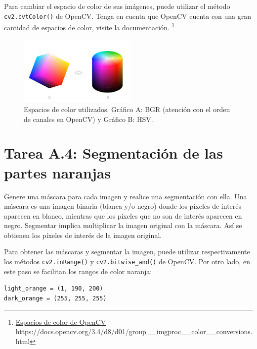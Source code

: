 Para cambiar el espacio de color de sus imágenes, puede utilizar el método \texttt{cv2.cvtColor()} de OpenCV. Tenga en cuenta que OpenCV cuenta con una gran cantidad de espacios de color, visite la documentación. \footnote{ \href{https://docs.opencv.org/3.4/d8/d01/group\_\_imgproc\_\_color\_\_conversions.html}{Espacios de color de OpenCV} https://docs.opencv.org/3.4/d8/d01/group\_\_imgproc\_\_color\_\_conversions.html}



\begin{figure}[h]
    \centering
    \includegraphics[width=0.5\textwidth]{Lab_2/template/figures/color_spaces.png}
    \caption{Espacios de color utilizados. Gráfico A: BGR (atención con el orden de canales en OpenCV) y Gráfico B: HSV.}
    
    \label{fig:color_spaces}
\end{figure}

\section*{Tarea A.4: Segmentación de las partes naranjas}

Genere una máscara para cada imagen y realice una segmentación con ella. Una máscara es una imagen binaria (blanca y/o negro) donde los píxeles de interés aparecen en blanco, mientras que los píxeles que no son de interés aparecen en negro. Segmentar implica multiplicar la imagen original con la máscara. Así se obtienen los píxeles de interés de la imagen original.

Para obtener las máscaras y segmentar la imagen, puede utilizar respectivamente los métodos \texttt{cv2.inRange()} y \texttt{cv2.bitwise\_and()} de OpenCV. Por otro lado, en este paso se facilitan los rangos de color naranja:

\begin{tcolorbox}[colback=gray!85, coltext=white, colframe=white, fonttitle=\bfseries, title=Important Note, boxrule=0.5mm]
\texttt{light\_orange = (1, 190, 200)}\\
\texttt{dark\_orange = (255, 255, 255)}
\end{tcolorbox}


